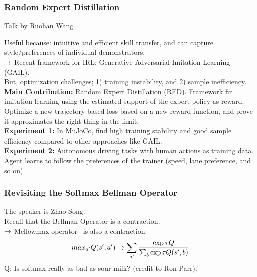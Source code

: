 \subsubsection{Random Expert Distillation~\cite{wang2019random}}

Talk by Ruohan Wang \\


Useful because: intuitive and efficient skill transfer, and can capture style/preferences of individual demonstrators. \\

$\rightarrow$ Recent framework for IRL: Generative Adversarial Imitation Learning (GAIL). \\

But, optimization challenges; 1) training instability, and 2) sample inefficiency. \\

{\bf Main Contribution:} Random Expert Distillation (RED). Framework fir imitation learning using the estimated support of the expert policy as reward. \\

Optimize a new trajectory based loss based on a new reward function, and prove it approximates the right thing in the limit. \\

{\bf Experiment 1:} In MuJoCo, find high training stability and good sample efficiency compared to other approaches like GAIL. \\

{\bf Experiment 2:} Autonomous driving tasks with human actions as training data. Agent learns to follow the preferences of the trainer (speed, lane preference, and so on).

\spacerule

\subsubsection{Revisiting the Softmax Bellman Operator~\cite{song2019revisiting}}

The speaker is Zhao Song. \\

Recall that the Bellman Operator is a contraction. \\

$\rightarrow$ Mellowmax operator~\cite{asadi2017alternative} is also a contraction:
\[
max_{a'} Q(s',a') \rightarrow \sum_{a'} \frac{\exp \tau Q}{\sum_b \exp \tau Q(s',b)}
\]
Q: Is softmax really as bad as sour milk? (credit to Ron Parr). \\


